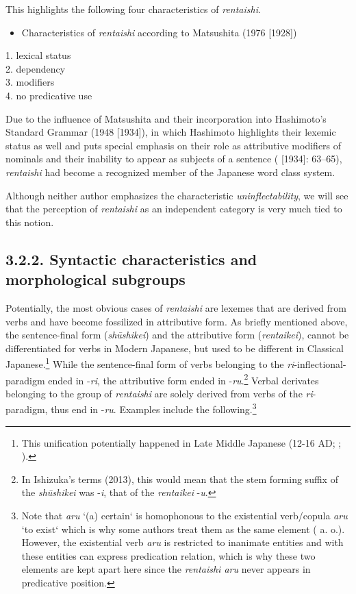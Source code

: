 \documentclass[output=paper]{langscibook}
\begin{document}
This highlights the following four characteristics of \textit{rentaishi}.

\begin{itemize}
\item \begin{styleBeispielCinqueKapitel}
Characteristics of \textit{rentaishi} according to Matsushita (1976 [1928])
\end{styleBeispielCinqueKapitel}
\end{itemize}
\begin{styleBeispielCinqueKapitel}
1. lexical status\\
2. dependency\\
3. modifiers\\
4. no predicative use 
\end{styleBeispielCinqueKapitel}

Due to the influence of Matsushita and their incorporation into Hashimoto’s Standard Grammar (1948 [1934]), in which Hashimoto highlights their lexemic status as well and puts special emphasis on their role as attributive modifiers of nominals and their inability to appear as subjects of a sentence (\citealt{Hashimoto1948} [1934]: 63–65), \textit{rentaishi} had become a recognized member of the Japanese word class system. 

Although neither author emphasizes the characteristic \textit{uninflectability}, we will see that the perception of \textit{rentaishi} as an independent category is very much tied to this notion. 

\subsection{3.2.2. Syntactic characteristics and morphological subgroups}

Potentially, the most obvious cases of \textit{rentaishi} are lexemes that are derived from verbs and have become fossilized in attributive form. As briefly mentioned above, the sentence-final form (\textit{shūshikei}) and the attributive form (\textit{rentaikei}), cannot be differentiated for verbs in Modern Japanese, but used to be different in Classical Japanese.\footnote{This unification potentially happened in Late Middle Japanese (12-16 AD; \citealt{Lewin2003}; \citealt{Frellesvig2010}).} While the sentence-final form of verbs belonging to the \textit{ri}{}-inflectional-paradigm ended in -\textit{ri}, the attributive form ended in -\textit{ru}.\footnote{In Ishizuka’s terms (2013), this would mean that the stem forming suffix of the \textit{shūshikei} was -\textit{i}, that of the \textit{rentaikei} {}-\textit{u}.} Verbal derivates belonging to the group of \textit{rentaishi} are solely derived from verbs of the \textit{ri}{}-paradigm, thus end in -\textit{ru}. Examples include the following.\footnote{Note that \textit{aru} ‘(a) certain‘ is homophonous to the existential verb/copula \textit{aru} ‘to exist‘ which is why some authors treat them as the same element (\citealt{LehmanNishina2015} a. o.). However, the existential verb \textit{aru} is restricted to inanimate entities and with these entities can express predication relation, which is why these two elements are kept apart here since the \textit{rentaishi aru} never appears in predicative position.}
\end{document}
